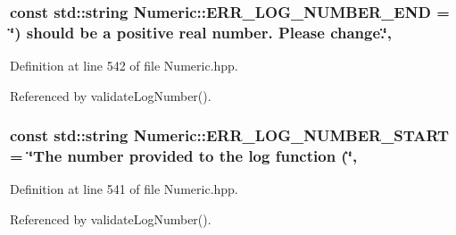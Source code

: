 \hypertarget{classmultiscale_1_1Numeric_a2f61b82d42049e175a8d34cd75966c6c}{
\subsubsection[{E\-R\-R\-\_\-\-L\-O\-G\-\_\-\-N\-U\-M\-B\-E\-R\-\_\-\-E\-N\-D}]{\setlength{\rightskip}{0pt plus 5cm}const std\-::string Numeric\-::\-E\-R\-R\-\_\-\-L\-O\-G\-\_\-\-N\-U\-M\-B\-E\-R\-\_\-\-E\-N\-D = \char`\"{}) should be a positive real number. Please change.\char`\"{}\hspace{0.3cm}{\ttfamily [static]}, {\ttfamily [private]}}}\label{classmultiscale_1_1Numeric_a2f61b82d42049e175a8d34cd75966c6c}


Definition at line 542 of file Numeric.\-hpp.



Referenced by validate\-Log\-Number().

\hypertarget{classmultiscale_1_1Numeric_a88ca9309ade745700dacbdc7c0d713f2}{
\subsubsection[{E\-R\-R\-\_\-\-L\-O\-G\-\_\-\-N\-U\-M\-B\-E\-R\-\_\-\-S\-T\-A\-R\-T}]{\setlength{\rightskip}{0pt plus 5cm}const std\-::string Numeric\-::\-E\-R\-R\-\_\-\-L\-O\-G\-\_\-\-N\-U\-M\-B\-E\-R\-\_\-\-S\-T\-A\-R\-T = \char`\"{}The number provided to the {\bf log} function (\char`\"{}\hspace{0.3cm}{\ttfamily [static]}, {\ttfamily [private]}}}\label{classmultiscale_1_1Numeric_a88ca9309ade745700dacbdc7c0d713f2}


Definition at line 541 of file Numeric.\-hpp.



Referenced by validate\-Log\-Number().

